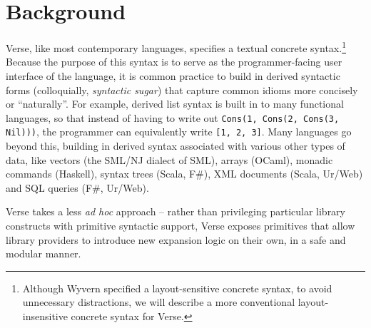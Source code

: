 \section{Background}\label{sec:background}
Verse, like most contemporary languages, specifies a textual concrete syntax.\footnote{Although Wyvern specified a layout-sensitive concrete syntax, to avoid unnecessary distractions, we will describe a more conventional layout-insensitive concrete syntax for Verse.} %
Because the purpose of this syntax is to serve as the programmer-facing user interface of the language, it is common practice to build in  derived syntactic forms (colloquially, \emph{syntactic sugar}) that capture common idioms more concisely or ``naturally''. %
For example, derived list syntax is built in to many functional languages, so that instead of having to write out \lstinline{Cons(1, Cons(2, Cons(3, Nil)))}, the programmer can equivalently write \lstinline{[1, 2, 3]}. Many languages go beyond this, building in derived syntax associated with various other types of data, like vectors (the SML/NJ dialect of SML), arrays (OCaml), monadic commands (Haskell), syntax trees (Scala, F\#), XML documents (Scala, Ur/Web) and SQL queries (F\#, Ur/Web). %

Verse takes a less \emph{ad hoc} approach -- rather than privileging  particular library constructs with primitive syntactic support, Verse exposes primitives that allow library providers to introduce new expansion logic on their own, in a safe and modular manner. %


